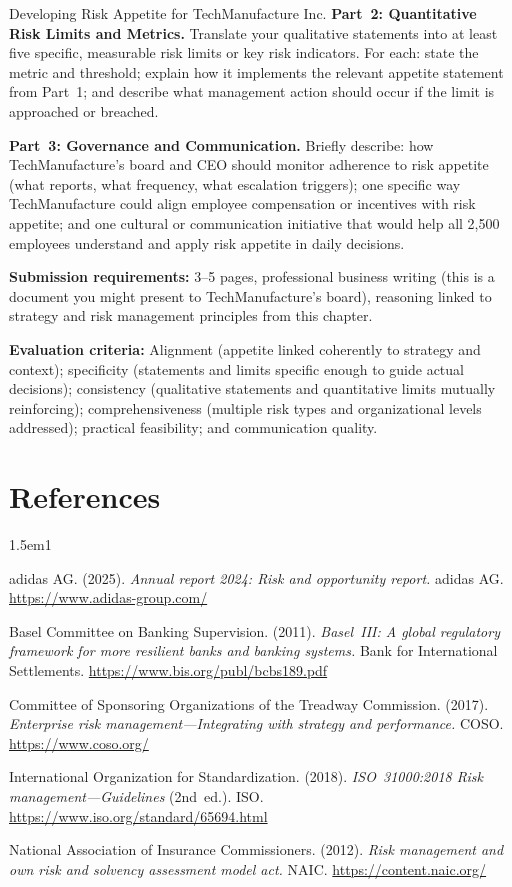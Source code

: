\documentclass[11pt,openany]{book}
\begin{document}
\begin{minicase}{Developing Risk Appetite for TechManufacture Inc.}
\textbf{Part~2: Quantitative Risk Limits and Metrics.} Translate your
qualitative statements into at least five specific, measurable risk limits or
key risk indicators. For each: state the metric and threshold; explain how it
implements the relevant appetite statement from Part~1; and describe what
management action should occur if the limit is approached or breached.

\textbf{Part~3: Governance and Communication.} Briefly describe: how
TechManufacture's board and CEO should monitor adherence to risk appetite (what
reports, what frequency, what escalation triggers); one specific way
TechManufacture could align employee compensation or incentives with risk
appetite; and one cultural or communication initiative that would help all 2,500
employees understand and apply risk appetite in daily decisions.

\medskip
\textbf{Submission requirements:} 3--5 pages, professional business writing
(this is a document you might present to TechManufacture's board), reasoning
linked to strategy and risk management principles from this chapter.

\textbf{Evaluation criteria:} Alignment (appetite linked coherently to strategy
and context); specificity (statements and limits specific enough to guide actual
decisions); consistency (qualitative statements and quantitative limits mutually
reinforcing); comprehensiveness (multiple risk types and organizational levels
addressed); practical feasibility; and communication quality.

\end{minicase}

\section*{References}
\begingroup
\sloppy

\begin{hangparas}{1.5em}{1}

adidas AG. (2025). \emph{Annual report 2024: Risk and opportunity report.}
adidas AG. \url{https://www.adidas-group.com/}

Basel Committee on Banking Supervision. (2011). \emph{Basel~III: A global
regulatory framework for more resilient banks and banking systems.} Bank for
International Settlements. \url{https://www.bis.org/publ/bcbs189.pdf}

Committee of Sponsoring Organizations of the Treadway Commission. (2017).
\emph{Enterprise risk management---Integrating with strategy and performance.}
COSO. \url{https://www.coso.org/}

International Organization for Standardization. (2018). \emph{ISO~31000:2018
Risk management---Guidelines} (2nd~ed.). ISO.
\url{https://www.iso.org/standard/65694.html}

National Association of Insurance Commissioners. (2012). \emph{Risk management
and own risk and solvency assessment model act.} NAIC.
\url{https://content.naic.org/}

\end{hangparas}

\endgroup
\end{document}
